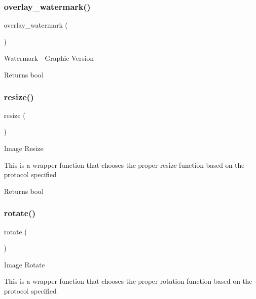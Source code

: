 \subsubsection{\texorpdfstring{overlay\+\_\+watermark()}{overlay\_watermark()}}
{\footnotesize\ttfamily overlay\+\_\+watermark (\begin{DoxyParamCaption}{ }\end{DoxyParamCaption})}

Watermark -\/ Graphic Version

\begin{DoxyReturn}{Returns}
bool 
\end{DoxyReturn}
\mbox{\label{class_c_i___image__lib_a94e38a7d478ce07200a52c51497e598e}} 
\subsubsection{\texorpdfstring{resize()}{resize()}}
{\footnotesize\ttfamily resize (\begin{DoxyParamCaption}{ }\end{DoxyParamCaption})}

Image Resize

This is a wrapper function that chooses the proper resize function based on the protocol specified

\begin{DoxyReturn}{Returns}
bool 
\end{DoxyReturn}
\mbox{\label{class_c_i___image__lib_a74e94d71195d9cbb9c9e3bca3353d912}} 
\subsubsection{\texorpdfstring{rotate()}{rotate()}}
{\footnotesize\ttfamily rotate (\begin{DoxyParamCaption}{ }\end{DoxyParamCaption})}

Image Rotate

This is a wrapper function that chooses the proper rotation function based on the protocol specified

